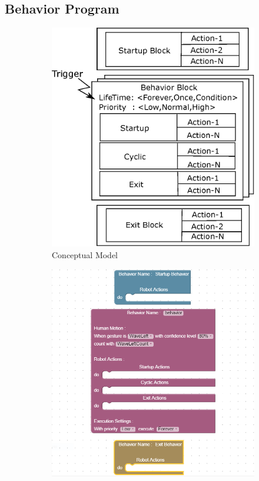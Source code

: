 \documentclass{llncs}
\begin{document}
\subsection{Behavior Program}
\label{ssec:behavior_program}
\begin{figure}
\centering
\begin{subfigure}[t]{0.48\textwidth}
\includegraphics[width=\textwidth]{../thesis/assets/program_structure.eps}
\caption[Conceptual Model]{Conceptual Model}
\label{fig:program_concept}
\end{subfigure}
\begin{subfigure}[t]{0.48\textwidth}
\includegraphics[width=\textwidth]{../thesis/assets/program_block.png}

\end{subfigure}
\end{figure}
\end{document}
